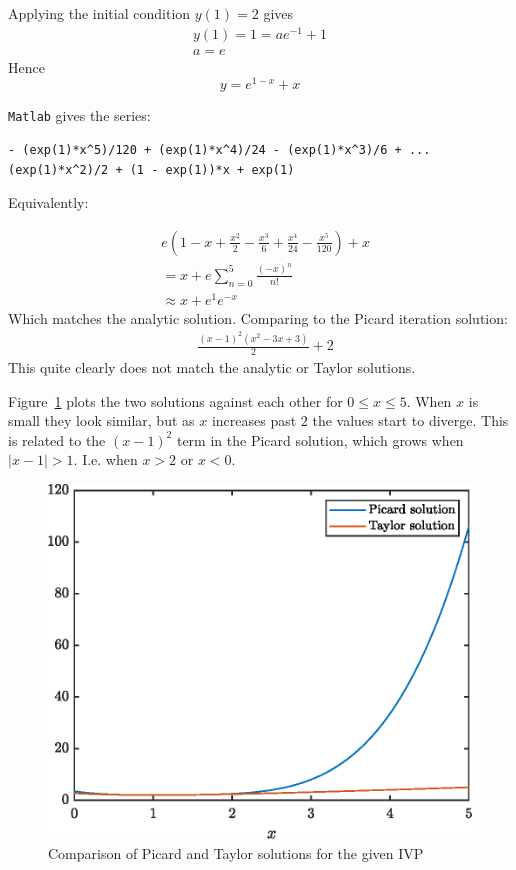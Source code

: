 \documentclass{X:/Documents/Coding/Latex/myassignment}
\begin{document}
\begin{enumerate}
\begin{enumerate}
		Applying the initial condition $y(1) =2 $ gives
		\begin{align*}
			y(1) = 1 = ae^{-1} + 1\\
			a = e
		\end{align*}
		Hence
		\[y = e^{1-x} + x\]


		\verb|Matlab| gives the series:
\begin{verbatim}
- (exp(1)*x^5)/120 + (exp(1)*x^4)/24 - (exp(1)*x^3)/6 + ...
(exp(1)*x^2)/2 + (1 - exp(1))*x + exp(1)
\end{verbatim}
		Equivalently:

		\begin{align*}
			&e\left(1 - x + \frac{x^2}2 - \frac{x^3}{6} + \frac{x^4}{24} - \frac{x^5}{120}\right) + x\\
			&=x + e \sum_{n=0}^5 \frac{(-x)^n}{n!}\\
			&\approx x + e^1e^{-x} 
		\end{align*}
		Which matches the analytic solution. Comparing to the Picard iteration solution:
		\begin{align*}
			&\frac{(x - 1)^2(x^2 - 3x + 3)}{2} + 2
		\end{align*}
		This quite clearly does not match the analytic or Taylor solutions.

		Figure~\ref{fig:q1b} plots the two solutions against each other for $0\leq x \leq 5$. When $x$ is small they look similar, but as $x$ increases past $2$ the values start to diverge. This is related to the $(x-1)^2$ term in the Picard solution, which grows when $|x-1| >1$. I.e. when $x > 2$ or $x<0$.



		\begin{figure}[tbh]
			\centering
			\includegraphics[width=\linewidth]{ODEsA4Q1b,eps}
			\caption{Comparison of Picard and Taylor solutions for the given IVP}
			\label{fig:q1b}
		\end{figure}



\end{enumerate}
\end{enumerate}
\end{document}
